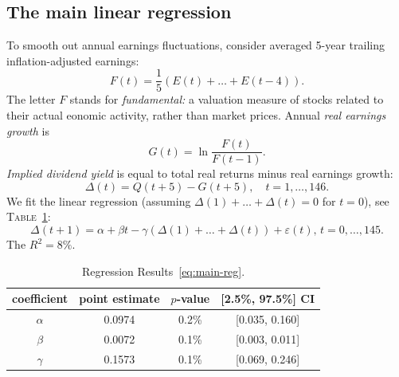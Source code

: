 \documentclass[12pt]{amsart}
\theoremstyle{definition}
\begin{document}
\subsection{The main linear regression} To smooth out annual earnings fluctuations, consider averaged 5-year trailing inflation-adjusted earnings: 
$$
F(t) = \frac15(E(t) + \ldots + E(t-4)).
$$
The letter $F$ stands for {\it fundamental:} a valuation measure of stocks related to their actual eonomic activity, rather than market prices. Annual {\it real earnings growth} is
$$
G(t) = \ln\frac{F(t)}{F(t-1)}. 
$$
{\it Implied dividend yield} is equal to total real returns minus real earnings growth:
\begin{equation}
\label{eq:idy-def}
\Delta(t) = Q(t+5) - G(t+5),\quad t = 1, \ldots, 146.
\end{equation}
We fit the linear regression (assuming $\Delta(1) + \ldots + \Delta(t) = 0$ for $t = 0$), see \textsc{Table}~\ref{table:reg-results}:
\begin{equation}
\label{eq:main-reg}
\Delta(t+1) = \alpha + \beta t - \gamma(\Delta(1) + \ldots + \Delta(t)) + \varepsilon(t),\, t = 0, \ldots, 145.
\end{equation}
The $R^2 = 8\%$.

\begin{table}
\begin{tabular}{|c|c|c|c|}
\hline
coefficient & point estimate & $p$-value & [2.5\%, 97.5\%] CI \\
\hline
$\alpha$ & 0.0974 & 0.2\% & [0.035, 0.160] \\
\hline
$\beta$ & 0.0072 & 0.1\% & [0.003, 0.011] \\
\hline 
$\gamma$ & 0.1573 & 0.1\% & [0.069, 0.246] \\
\hline
\end{tabular}
\vspace{0.2cm}
\caption{Regression Results~\eqref{eq:main-reg}.}
\label{table:reg-results}
\end{table}
\end{document}
